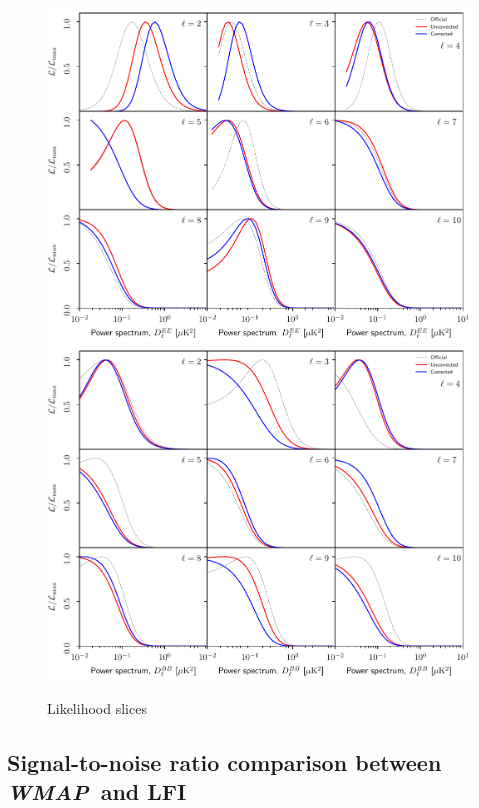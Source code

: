 \documentclass[twocolumn]{../../common/aa}
\def\WMAP{\emph{WMAP}}
\begin{document}
\begin{figure}[t]
  	\centering
	\includegraphics[width=\linewidth]{figures/lnL_EE_v1.pdf}
        \includegraphics[width=\linewidth]{figures/lnL_BB_v1.pdf}
	\caption{Likelihood slices}
	\label{fig:lnL}
\end{figure}


\subsection{Signal-to-noise ratio comparison between \WMAP\ and LFI}
\label{sec:s2n}
\end{document}
